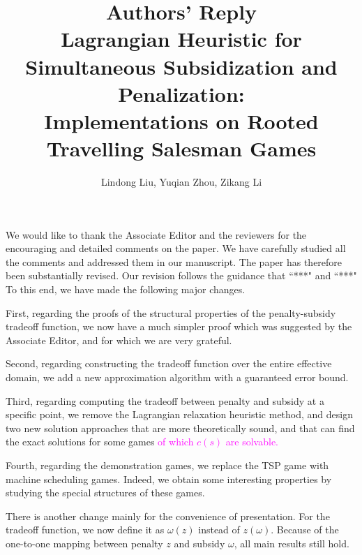 \documentclass[11pt]{article}
\title{\textbf{Authors' Reply\\Lagrangian Heuristic for Simultaneous Subsidization and Penalization:\\
Implementations on Rooted Travelling Salesman Games}}
\author{Lindong Liu, Yuqian Zhou, Zikang Li}
\date{}
\begin{document}
\maketitle
\noindent
We would like to thank the Associate Editor and the reviewers for the encouraging and detailed comments on the paper. We have carefully studied all the comments and addressed them in our manuscript. The paper has therefore been substantially revised.
Our revision follows the  guidance that ``***" and ``***" To this end, we have made the following major changes.


First, regarding the proofs of the structural properties of the penalty-subsidy tradeoff function, we now have a much simpler proof which was suggested by the Associate Editor, and for which we are very grateful.

Second, regarding constructing the tradeoff function over the entire effective domain, we add a new approximation algorithm with a guaranteed error bound.


Third, regarding computing the tradeoff between penalty and subsidy at a specific point, we remove the Lagrangian relaxation heuristic method, and design two new solution approaches that are more theoretically sound, and that can find the exact solutions for some games \textcolor{magenta}{of which $c(s)$ are solvable.}


Fourth, regarding the demonstration games, we replace the TSP game with machine scheduling games. Indeed, we obtain some interesting properties by studying the special structures of these games.

There is another change mainly for the convenience of presentation. For the tradeoff function, we now define it as $\omega(z)$ instead of $z(\omega)$. Because of the one-to-one mapping between penalty $z$ and subsidy $\omega$, all main results still hold.
\end{document}
